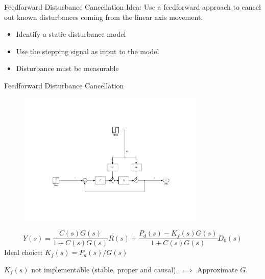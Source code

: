 \documentclass[10pt]{beamer}
\begin{document}
\begin{frame}{Feedforward Disturbance Cancellation}
  \alert{Idea}: Use a feedforward approach to cancel out known disturbances coming from the linear axis movement.
  \begin{itemize}
    \item Identify a static disturbance model
    \item Use the stepping signal as input to the model
    \item Disturbance must be measurable
  \end{itemize}
\end{frame}

\begin{frame}{Feedforward Disturbance Cancellation}
  \begin{figure}[h]
    \centering %
    \includegraphics[width=0.8\textwidth, trim=8cm 4.5cm 5.97cm 8.5cm, clip=true]{../fig/matlab/ffdist}
  \end{figure}
  \begin{equation*}
    \label{eq:ffdist}
    Y(s) = \frac{C(s)G(s)}{1+C(s)G(s)}R(s) + \frac{P_d(s) - K_f(s)G(s)}{1+C(s)G(s)}D_0(s)
  \end{equation*}
  Ideal choice: $K_f(s)=P_d(s)/G(s)$

   $K_f(s)$ not implementable (stable, proper and causal). $\implies$
   Approximate $G$.
\end{frame}
\end{document}
